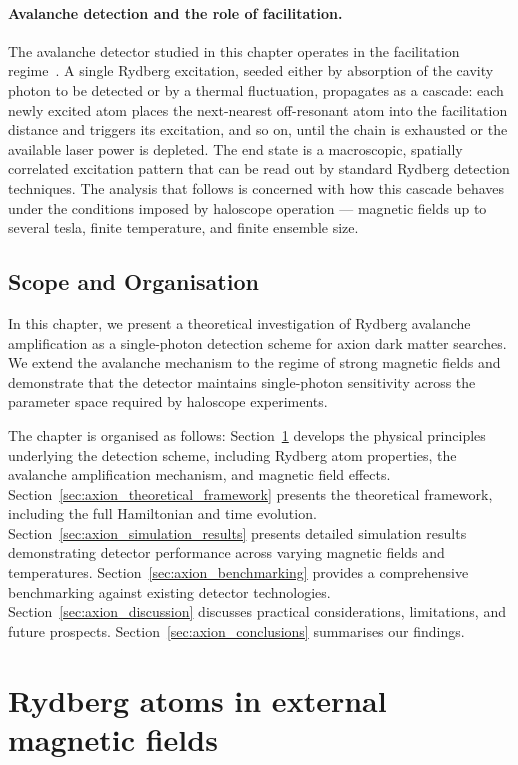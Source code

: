 \paragraph{Avalanche detection and the role of facilitation.}
The avalanche detector studied in this chapter operates in the
facilitation regime~\cite{Nill2024,Festa2022}. A single Rydberg
excitation, seeded either by absorption of the cavity photon to be
detected or by a thermal fluctuation, propagates as a cascade: each
newly excited atom places the next-nearest off-resonant atom into the
facilitation distance and triggers its excitation, and so on, until
the chain is exhausted or the available laser power is depleted. The
end state is a macroscopic, spatially correlated excitation pattern
that can be read out by standard Rydberg detection techniques. The
analysis that follows is concerned with how this cascade behaves under
the conditions imposed by haloscope operation --- magnetic fields up
to several tesla, finite temperature, and finite ensemble size.

\subsection*{Scope and Organisation}
In this chapter, we present a theoretical investigation of Rydberg avalanche amplification as a single-photon detection scheme for axion dark matter searches. We extend the avalanche mechanism to the regime of strong magnetic fields and demonstrate that the detector maintains single-photon sensitivity across the parameter space required by haloscope experiments.

The chapter is organised as follows: Section~\ref{sec:axion_physical_principles} develops the physical principles underlying the detection scheme, including Rydberg atom properties, the avalanche amplification mechanism, and magnetic field effects. Section~\ref{sec:axion_theoretical_framework} presents the theoretical framework, including the full Hamiltonian and time evolution. Section~\ref{sec:axion_simulation_results} presents detailed simulation results demonstrating detector performance across varying magnetic fields and temperatures. Section~\ref{sec:axion_benchmarking} provides a comprehensive benchmarking against existing detector technologies. Section~\ref{sec:axion_discussion} discusses practical considerations, limitations, and future prospects. Section~\ref{sec:axion_conclusions} summarises our findings.

\section{Rydberg atoms in external magnetic fields}
\label{sec:axion_physical_principles}

